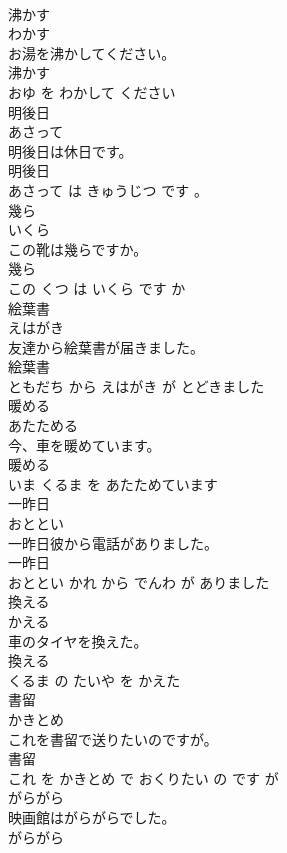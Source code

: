 \documentclass[8pt]{extreport}
\begin{document}
\begin{CJK}{UTF8}{min}
\\	沸かす	
\\	わかす			
\\	お湯を沸かしてください。	
\\	沸かす 
\\	おゆ を わかして ください			
\\	明後日	
\\	あさって			
\\	明後日は休日です。	
\\	明後日 
\\	あさって は きゅうじつ です 。			
\\	幾ら	
\\	いくら			
\\	この靴は幾らですか。	
\\	幾ら 
\\	この くつ は いくら です か			
\\	絵葉書	
\\	えはがき			
\\	友達から絵葉書が届きました。	
\\	絵葉書 
\\	ともだち から えはがき が とどきました			
\\	暖める	
\\	あたためる			
\\	今、車を暖めています。	
\\	暖める 
\\	いま くるま を あたためています			
\\	一昨日	
\\	おととい			
\\	一昨日彼から電話がありました。	
\\	一昨日 
\\	おととい かれ から でんわ が ありました			
\\	換える	
\\	かえる			
\\	車のタイヤを換えた。	
\\	換える 
\\	くるま の たいや を かえた			
\\	書留	
\\	かきとめ			
\\	これを書留で送りたいのですが。	
\\	書留 
\\	これ を かきとめ で おくりたい の です が			
\\	がらがら	
\\	映画館はがらがらでした。	
\\	がらがら 

\end{CJK}
\end{document}
